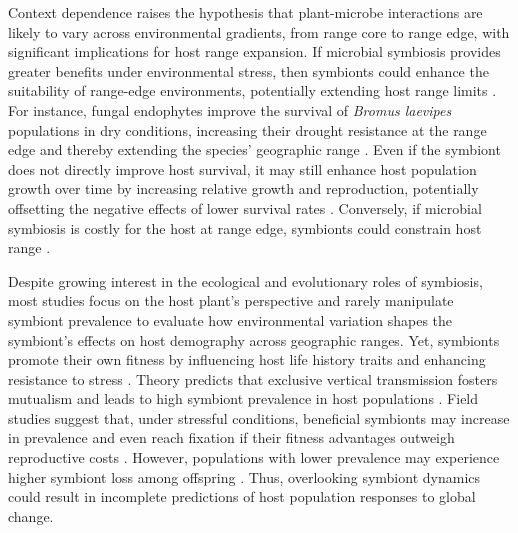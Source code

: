 \documentclass[12pt]{article}\usepackage[]{graphicx}\usepackage[dvipsnames]{xcolor}
\begin{document}
Context dependence raises the hypothesis that plant-microbe interactions are likely to vary across environmental gradients, from range core to range edge, with significant implications for host range expansion. If microbial symbiosis provides greater benefits under environmental stress, then symbionts could enhance the suitability of range-edge environments, potentially extending host range limits \citep{allsup2023shifting,rudgers2020climate}.
For instance, fungal endophytes improve the survival of \emph{Bromus laevipes}  populations in dry conditions, increasing their drought resistance at the range edge and thereby extending the species' geographic range \citep{david2019soil,afkhami2014mutualist}.
Even if the symbiont does not directly improve host survival, it may still enhance host population growth over time by increasing relative growth and reproduction, potentially offsetting the negative effects of lower survival rates \citep{yule2013costs}.
Conversely, if microbial symbiosis is costly for the host at range edge, symbionts could constrain host range \citep{benning2021microbes,benning2021plant,bennett2022costs}.

Despite growing interest in the ecological and evolutionary roles of symbiosis, most studies focus on the host plant’s perspective and rarely manipulate symbiont prevalence to evaluate how environmental variation shapes the symbiont’s effects on host demography across geographic ranges. 
Yet, symbionts promote their own fitness by influencing host life history traits and enhancing resistance to stress \citep{kazenel2015mutualistic, giauque2019endophyte, saikkonen1998fungal}. 
Theory predicts that exclusive vertical transmission fosters mutualism and leads to high symbiont prevalence in host populations \citep{fine1975vectors}. 
Field studies suggest that, under stressful conditions, beneficial symbionts may increase in prevalence and even reach fixation if their fitness advantages outweigh reproductive costs \citep{donald2021context}. 
However, populations with lower prevalence may experience higher symbiont loss among offspring \citep{afkhami2008symbiosis}. 
Thus, overlooking symbiont dynamics could result in incomplete predictions of host population responses to global change.
\end{document}
